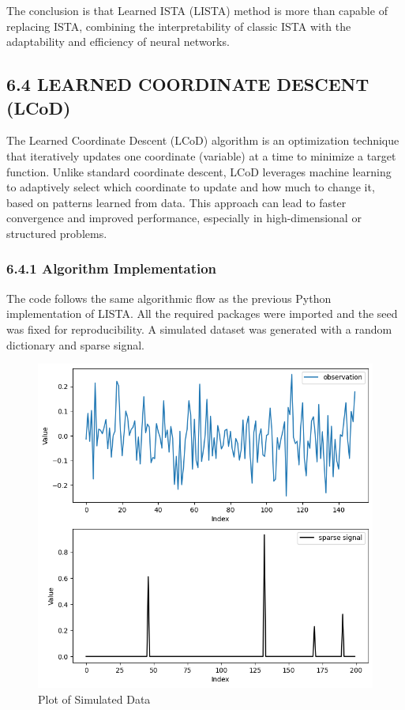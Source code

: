 \documentclass[
  letterpaper,
  DIV=11,
  numbers=noendperiod]{scrartcl}
\begin{document}
The conclusion is that Learned ISTA (LISTA) method is more than capable
of replacing ISTA, combining the interpretability of classic ISTA with
the adaptability and efficiency of neural networks.

\subsection{6.4 LEARNED COORDINATE DESCENT
(LCoD)}\label{learned-coordinate-descent-lcod}

The Learned Coordinate Descent (LCoD) algorithm is an optimization
technique that iteratively updates one coordinate (variable) at a time
to minimize a target function. Unlike standard coordinate descent, LCoD
leverages machine learning to adaptively select which coordinate to
update and how much to change it, based on patterns learned from data.
This approach can lead to faster convergence and improved performance,
especially in high-dimensional or structured problems.

\subsubsection{6.4.1 Algorithm
Implementation}\label{algorithm-implementation-3}

The code follows the same algorithmic flow as the previous Python
implementation of LISTA. All the required packages were imported and the
seed was fixed for reproducibility. A simulated dataset was generated
with a random dictionary and sparse signal.

\begin{figure}[H]

{\centering \includegraphics[width=1\linewidth,height=\textheight,keepaspectratio]{abar-cs_files/mediabag/sample_seed_cod.png}

}

\caption{Plot of Simulated Data}

\end{figure}%
\end{document}

